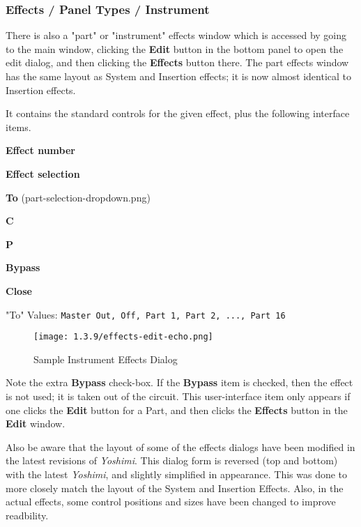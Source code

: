 \subsubsection{Effects / Panel Types / Instrument }
\label{subsubsec:effects_paneltypes_instrument}

   There is also a "part" or "instrument" effects window which is accessed
   by going to the main window, clicking the \textbf{Edit} button in the
   bottom panel to open the edit dialog, and then clicking the
   \textbf{Effects} button there.  The part effects window has the
   same layout as System and Insertion effects; it is now almost identical
   to Insertion effects.

   It contains the standard controls for the given effect, plus the
   following interface items.

   \begin{enumber}
      \item \textbf{Effect number}
      \item \textbf{Effect selection}
      \item \textbf{To} (part-selection-dropdown.png)
      \item \textbf{C}
      \item \textbf{P}
      \item \textbf{Bypass}
      \item \textbf{Close}
   \end{enumber}

   "To" Values: \texttt{Master Out, Off, Part 1, Part 2, ..., Part 16}

\begin{figure}[H]
   \centering
   \texttt{[image: 1.3.9/effects-edit-echo.png]}
   \caption{Sample Instrument Effects Dialog}
   \label{fig:sample_instrument_effects_dialog}
\end{figure}

   Note the extra \textbf{Bypass} check-box.  If the \textbf{Bypass} item is
   checked, then the effect is not used; it is taken out of the circuit.  This
   user-interface item only appears if one clicks the \textbf{Edit} button for
   a Part, and then clicks the \textbf{Effects} button in the \textbf{Edit}
   window.

   Also be aware that the layout of some of the effects dialogs have been modified
   in the latest revisions of \textsl{Yoshimi}.
   This dialog form is reversed (top and bottom) with the latest
   \textsl{Yoshimi}, and slightly simplified in appearance. This was done to more
   closely match the layout of the System and Insertion Effects.
   Also, in the actual effects, some control positions and sizes have been changed
   to improve readbility.

